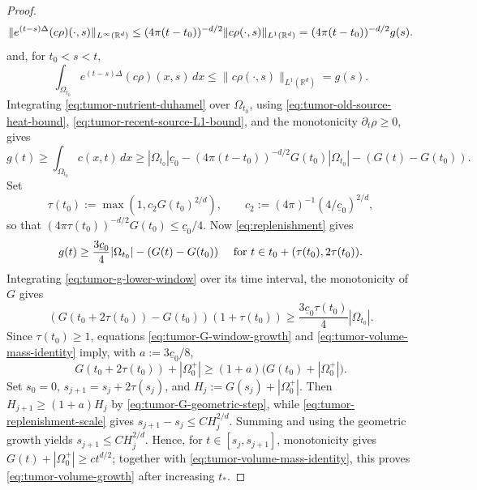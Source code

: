 \documentclass[11pt]{amsart}
\numberwithin{equation}{section}
\numberwithin{figure}{section}
\theoremstyle{plain}
\theoremstyle{definition}
\theoremstyle{remark}
\theoremstyle{plain}
\def\R{\mathbb{R}}
\begin{document}
\begin{proof}
\begin{equation}\label{eq:tumor-old-source-heat-bound}
\|e^{(t-s)\Delta}(c\rho)(\cdot,s)\|_{L^{\infty}(\R^d)}
\leq (4\pi (t-t_0))^{-d/2}
  \|c\rho(\cdot,s)\|_{L^{1}(\R^d)}\\
=(4\pi (t-t_0))^{-d/2}g(s).
\end{equation}
and, for $t_0<s<t$,
\begin{equation}\label{eq:tumor-recent-source-L1-bound}
\int_{\Omega_{t_0}}e^{(t-s)\Delta}(c\rho)(x,s)\,dx
\leq \|c\rho(\cdot,s)\|_{L^1(\R^d)}=g(s).
\end{equation}
Integrating \eqref{eq:tumor-nutrient-duhamel} over $\Omega_{t_0}$, using
\eqref{eq:tumor-old-source-heat-bound},
\eqref{eq:tumor-recent-source-L1-bound}, and the monotonicity $\partial_t\rho\geq0$,
gives
\begin{equation}\label{eq:replenishment}
g(t)\geq \int_{\Omega_{t_0}}c(x,t)\,dx \geq |\Omega_{t_0}|\underline c_0
 -(4\pi(t-t_0))^{-d/2}G(t_0)|\Omega_{t_0}|
 -(G(t)-G(t_0)).
\end{equation}
Set
\begin{equation}\label{eq:tumor-replenishment-scale}
\tau(t_0):=\max \left(1, c_2G(t_0)^{2/d} \right), \qquad c_2:=(4\pi)^{-1}(4/\underline c_0)^{2/d},
\end{equation}
so that
$(4\pi\tau(t_0))^{-d/2}G(t_0)\leq \underline c_0/4$. Now
\eqref{eq:replenishment} gives
\begin{equation}\label{eq:tumor-g-lower-window}
g(t)\geq \frac{3\underline c_0}{4}|\Omega_{t_0}|
 -(G(t)-G(t_0)) \quad \hbox{ for } t\in t_0 + (\tau(t_0),2\tau(t_0)).
\end{equation}
Integrating \eqref{eq:tumor-g-lower-window} over its time interval,
the monotonicity of $G$ gives
\begin{equation}\label{eq:tumor-G-window-growth}
(G(t_0+2\tau(t_0))-G(t_0))(1+\tau(t_0))
\geq \frac{3\underline c_0 \tau(t_0)}{4}|\Omega_{t_0}|.
\end{equation}
Since $\tau(t_0)\geq1$, equations \eqref{eq:tumor-G-window-growth} and
\eqref{eq:tumor-volume-mass-identity} imply, with
$a:=3\underline c_0/8$,
\begin{equation}\label{eq:tumor-G-geometric-step}
 G(t_0+2\tau(t_0))+|\Omega_0^{+}|
 \geq (1+a)\bigl(G(t_0)+|\Omega_0^{+}|\bigr).
\end{equation}
Set $s_0=0$, $s_{j+1}=s_j+2\tau(s_j)$, and
$H_j:=G(s_j)+|\Omega_0^{+}|$. Then
$H_{j+1}\geq(1+a)H_j$ by \eqref{eq:tumor-G-geometric-step}, while
\eqref{eq:tumor-replenishment-scale} gives
$s_{j+1}-s_j\leq CH_j^{2/d}$. Summing and using the geometric growth yields
$s_{j+1}\leq CH_j^{2/d}$. Hence, for $t\in[s_j,s_{j+1}]$, monotonicity gives
$G(t)+|\Omega_0^{+}|\geq ct^{d/2}$; together with
\eqref{eq:tumor-volume-mass-identity}, this proves
\eqref{eq:tumor-volume-growth} after increasing $t_*$.
\end{proof}
\end{document}
